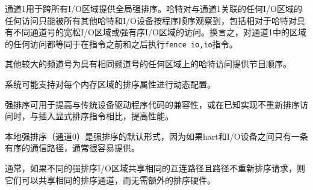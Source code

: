 {\iffalse
Channel 1 is used to provide global strong ordering across all I/O
regions.  Any accesses by a hart to any I/O region associated with
channel 1 can only be observed to have occurred in program order by all
other harts and I/O devices, including relative to accesses made by
that hart to relaxed I/O regions or strongly ordered I/O regions with
different channel numbers.  In other words, any access to a region in
channel 1 is equivalent to executing a {\tt fence io,io}
instruction before and after the instruction.
\fi
通道1用于跨所有I/O区域提供全局强排序。哈特对与通道1关联的任何I/O区域的任何访问只能被所有其他哈特和I/O设备按程序顺序观察到，包括相对于哈特对具有不同通道号的宽松I/O区域或强有序I/O区域的访问。换言之，对通道1中的区域的任何访问都等同于在指令之前和之后执行{\tt fence io,io}指令。

\iffalse
Other larger channel numbers provide program ordering to accesses by
that hart across any regions with the same channel number.

Systems might support dynamic configuration of ordering properties on
each memory region.
\fi
其他较大的频道号为具有相同频道号的任何区域上的哈特访问提供节目顺序。

系统可能支持对每个内存区域的排序属性进行动态配置。

\iffalse
\begin{commentary}
Strong ordering can be used to improve compatibility with legacy
device driver code, or to enable increased performance compared to
insertion of explicit ordering instructions when the implementation is
known to not reorder accesses.

Local strong ordering (channel 0) is the default form of strong
ordering as it is often straightforward to provide if there is only a
single in-order communication path between the hart and the I/O
device.

Generally, different strongly ordered I/O regions can share the same
ordering channel without additional ordering hardware if they share
the same interconnect path and the path does not reorder requests.
\end{commentary}
\fi
\begin{commentary}
强排序可用于提高与传统设备驱动程序代码的兼容性，或在已知实现不重新排序访问时，与插入显式排序指令相比，提高性能。

本地强排序（通道0）是强排序的默认形式，因为如果hart和I/O设备之间只有一条有序的通信路径，通常很容易提供。

通常，如果不同的强排序I/O区域共享相同的互连路径且路径不重新排序请求，则它们可以共享相同的排序通道，而无需额外的排序硬件。
\end{commentary}

}
